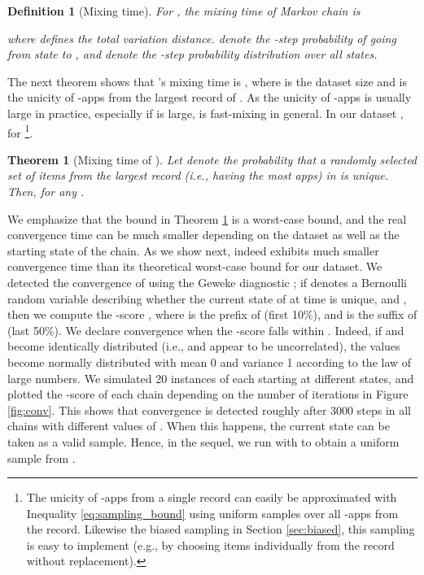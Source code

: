 \documentclass{acm_proc_article-sp}
\theoremstyle{plain}
\newtheorem{definition}{Definition}
\theoremstyle{plain}
\newtheorem{theorem}{Theorem}
\theoremstyle{plain}
\theoremstyle{plain}
\theoremstyle{plain}
\theoremstyle{plain}
\begin{document}
\begin{definition}[Mixing time]

For , the mixing time  of Markov chain  is

where 
 defines the total variation distance.  denote the -step probability of going from state  to , and
 denote the -step probability distribution over all states.
\end{definition}

The next theorem shows that 's mixing time is , where  is the dataset size and  is the unicity of -apps from the largest record of . 
As the unicity of -apps is usually large in practice, especially if  is large,  is fast-mixing in general. In our dataset ,  for  \footnote{The unicity of -apps from a single record can easily be approximated with Inequality \ref{eq:sampling_bound} using uniform samples over all -apps from the record. Likewise the biased sampling in Section \ref{sec:biased}, this sampling is easy to implement (e.g., by choosing  items individually from the record without replacement).}.

\begin{theorem}[Mixing time of ] 
\label{THM:MIXING}
Let  denote the probability that a randomly selected set of  items from the largest record  (i.e., having the most apps) in  is unique. Then,
 for any . 
\end{theorem}

We emphasize that the bound in Theorem \ref{THM:MIXING} is a worst-case bound, and the real convergence time can be much smaller depending on the dataset  as well as the starting state of the chain. As we show next,  indeed exhibits much smaller convergence time than its theoretical worst-case bound for our dataset. 
We detected the convergence of  using the Geweke diagnostic \cite{Geweke92}; if  denotes a Bernoulli random variable describing whether the current state of  at time  is unique, and , then we compute the -score  
, where  is the prefix of  (first 10\%), and  is the suffix of  (last 50\%). 
 We declare convergence when the -score falls within . Indeed, if  and  become identically distributed (i.e.,  and  appear to be uncorrelated), the  values become normally distributed with mean 0 and variance 1 according to the law of large numbers. 
We simulated 20 instances of  each starting at different states, and plotted the -score of each chain depending on the number of iterations  in Figure \ref{fig:conv}.
This shows that convergence is detected roughly after  3000 steps in all chains with different values of .
When this happens, the current state can be taken as a valid sample. Hence, in the sequel, we run  with  to obtain a uniform sample from .
\end{document}
